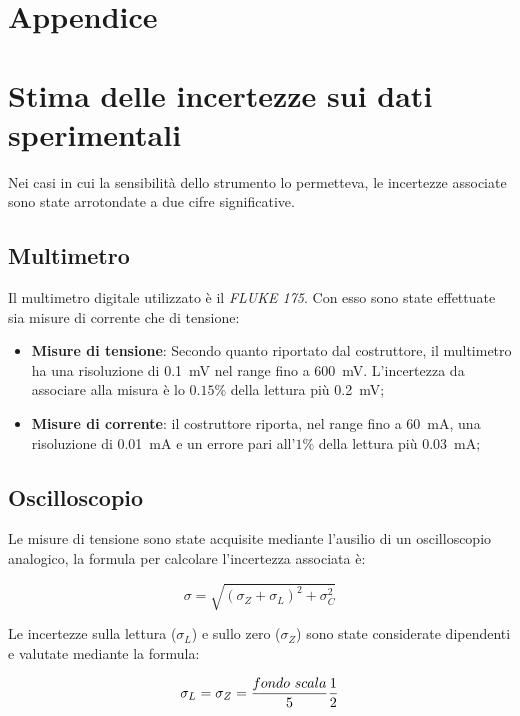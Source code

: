 \documentclass[@SRC@/main]{subfiles}
\begin{document}
    \section*{Appendice}
    \section{Stima delle incertezze sui dati sperimentali}
    \label{sec:stima-delle-incertezze-sui-dati-sperimentali}
    Nei casi in cui la sensibilità dello strumento lo permetteva, le incertezze associate sono
    state arrotondate a due cifre significative.
    \subsection*{Multimetro}
    Il multimetro digitale utilizzato è il \textit{FLUKE 175}.
    Con esso sono state effettuate sia misure di corrente che di tensione:
    \begin{itemize}
        \item \textbf{Misure di tensione}: Secondo quanto riportato dal costruttore, il multimetro
        ha una risoluzione di 0.1~mV nel range fino a 600~mV. L'incertezza da associare alla misura
        è lo $0.15\%$ della lettura più 0.2~mV;
        \item \textbf{Misure di corrente}: il costruttore riporta, nel range fino a
        60~mA, una risoluzione di 0.01~mA e un errore pari all'$1\%$ della
        lettura più 0.03~mA;
    \end{itemize}

    \subsection*{Oscilloscopio}
    \noindent Le misure di tensione sono state acquisite mediante l'ausilio di un oscilloscopio analogico,
    la formula per calcolare l'incertezza associata è:
    
        \begin{equation*}
            \sigma = \sqrt {\left( \sigma_Z + \sigma_L  \right)^2 + \sigma_C^2}
        \end{equation*}
    
\vspace{0.1cm}
    \noindent Le incertezze sulla lettura ($\sigma_L$) e sullo zero ($\sigma_Z$) sono state considerate dipendenti
    e valutate mediante la formula:
    \vspace{0.1cm}


        \begin{equation*}
            \sigma_L = \sigma_Z = \frac{fondo\textnormal{ }scala}{5} \frac{1}{2}
        \end{equation*}
\end{document}

